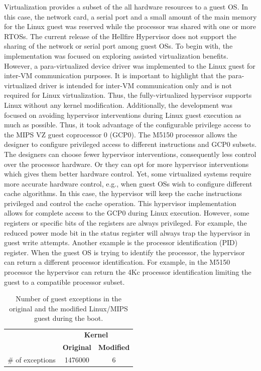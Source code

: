Virtualization provides a subset of the all hardware resources to a guest OS. In this case, the network card, a serial port and a small amount of the main memory for the Linux guest was reserved while the processor was shared with one or more RTOSs. The current release of the Hellfire Hypervisor does not support the sharing of the network or serial port among guest OSs. To begin with, the implementation was focused on exploring assisted virtualization benefits.  However, a para-virtualized device driver was implemented to the Linux guest for inter-VM communication purposes. It is important to highlight that the para-virtualized driver is intended for inter-VM communication only and is not required for Linux virtualization. Thus, the fully-virtualized hypervisor supports Linux without any kernel modification. Additionally, the development was focused on avoiding hypervisor interventions during Linux guest execution as much as possible. Thus, it took advantage of the configurable privilege access to the MIPS VZ guest coprocessor 0 (GCP0). The M5150 processor allows the designer to configure privileged access to different instructions and GCP0 subsets. The designers can choose fewer hypervisor interventions, consequently less control over the processor hardware. Or they can opt for more hypervisor interventions which gives them better hardware control. Yet, some virtualized systems require more accurate hardware control, e.g., when guest OSs wish to configure different cache algorithms. In this case, the hypervisor will keep the cache instructions privileged and control the cache operation. This hypervisor implementation allows for complete access to the GCP0 during Linux execution. However, some registers or specific bits of the registers are always privileged. For example, the reduced power mode bit in the status register will always trap the hypervisor in guest write attempts. Another example is the processor identification (PID) register. When the guest OS is trying to identify the processor, the hypervisor can return a different processor identification. For example, in the M5150 processor the hypervisor can return the 4Kc processor identification limiting the guest to a compatible processor subset. 


\begin{table}[!hbtp]
\caption{Number of guest exceptions in the original and the modified Linux/MIPS guest during the boot.}
\label{table:pooling}
\centering
\begin{tabular}{ccl}
\hline \hline
\textbf{}        & \multicolumn{2}{c}{\textbf{Kernel}}       \\
                  & \textbf{Original} & \textbf{Modified}     \\ \hline
\# of exceptions & 1476000           & \multicolumn{1}{c}{6} \\ \hline
\end{tabular}
\end{table}

